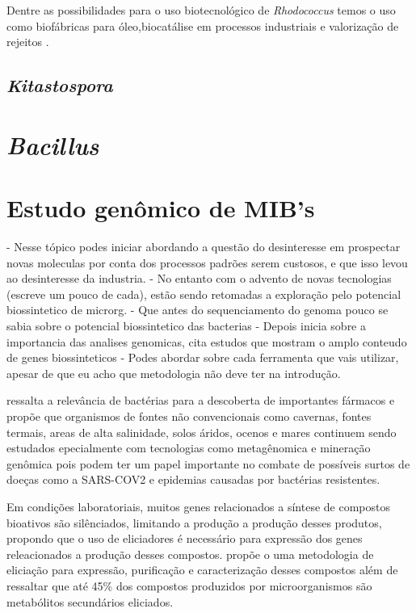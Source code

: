 Dentre as possibilidades para o uso biotecnológico de \textit{Rhodococcus} temos o uso como biofábricas 
para óleo,biocatálise em processos industriais e valorização de rejeitos \cite{alvarez2021,krivoruchko2019,anthony2019,chatterjee2020}.

\subsection{\textit{Kitastospora}}
\section{\textit{Bacillus}}

\section{Estudo genômico de MIB's}
- Nesse tópico podes iniciar abordando a questão do desinteresse em prospectar novas moleculas por conta dos processos padrões serem custosos, e que isso levou ao desinteresse da industria. 
- No  entanto com o advento de novas tecnologias (escreve um pouco de cada), estão sendo retomadas a exploração pelo potencial biossintetico de microrg.
- Que antes do sequenciamento do genoma pouco se sabia sobre o potencial biossintetico das bacterias
- Depois inicia sobre a importancia das analises genomicas, cita estudos que mostram o amplo conteudo de genes biossinteticos
- Podes abordar sobre cada ferramenta que vais utilizar, apesar de que eu acho que metodologia não deve ter na introdução.


 ressalta a relevância de bactérias para a descoberta de importantes
fármacos e propõe que organismos de fontes não convencionais como cavernas, fontes termais,
areas de alta salinidade, solos áridos, ocenos e mares continuem sendo estudados epecialmente
com tecnologias como metagênomica e mineração genômica pois podem ter um papel importante no 
combate de possíveis surtos de doeças como a SARS-COV2 e epidemias causadas por bactérias resistentes.

Em condições laboratoriais, muitos genes relacionados a síntese de
compostos bioativos são silênciados, limitando a produção a produção desses produtos, propondo
que o uso de eliciadores é necessário para expressão dos genes releacionados a produção desses 
compostos\cite{rutledge2015}.  propõe o uma metodologia de eliciação para expressão, purificação
e caracterização desses compostos além de ressaltar que até 45\% dos compostos produzidos por
microorganismos são metabólitos secundários eliciados.

